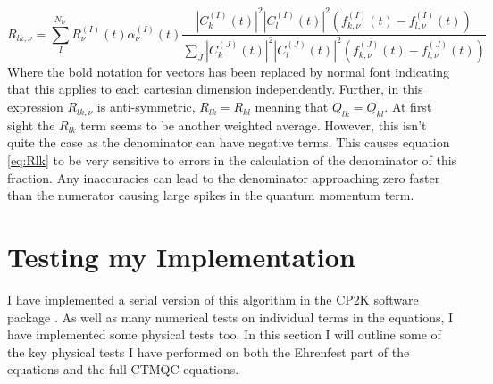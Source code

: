 \begin{equation}
  R_{lk, \nu} = \sum_{I}^{N_{tr}} R_{\nu}^{(I)}(t) \alpha_{\nu}^{(I)}(t) \frac{|C_{k}^{(I)}(t)|^2 |C_{l}^{(I)}(t)|^2 \left( f_{k, \nu}^{(I)}(t) - f_{l, \nu}^{(I)}(t) \right)}{\sum_{J} |C_{k}^{(J)}(t)|^2 |C_{l}^{(J)}(t)|^2 \left( f_{k, \nu}^{(J)}(t) - f_{l, \nu}^{(J)}(t) \right)}
  \label{eq:Rlk}
\end{equation}
Where the bold notation for vectors has been replaced by normal font indicating that this applies to each cartesian dimension independently. Further, in this expression $R_{lk, \nu}$ is anti-symmetric, $R_{lk} = R_{kl}$ meaning that $Q_{lk} = Q_{kl}$. At first sight the $R_{lk}$ term seems to be another weighted average. However, this isn't quite the case as the denominator can have negative terms. This causes equation \eqref{eq:Rlk} to be very sensitive to errors in the calculation of the denominator of this fraction. Any inaccuracies can lead to the denominator approaching zero faster than the numerator causing large spikes in the quantum momentum term.

\section{Testing my Implementation}
I have implemented a serial version of this algorithm in the CP2K software package \cite{CP2K}. As well as many numerical tests on individual terms in the equations, I have implemented some physical tests too. In this section I will outline some of the key physical tests I have performed on both the Ehrenfest part of the equations and the full CTMQC equations.
